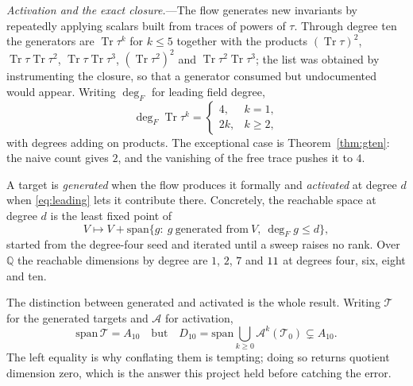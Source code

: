 \documentclass[
  aps,prd,
  reprint,
  letterpaper,
  amsmath,amssymb,
  nofootinbib,
  superscriptaddress
]{revtex4-2}
\theoremstyle{plain}
\newcommand{\Ften}{A_{10}}
\newcommand{\Dten}{D_{10}}
\newcommand{\Q}{\mathbb{Q}}
\begin{document}
\emph{Activation and the exact closure.}---The flow generates new invariants by
repeatedly applying scalars built from traces of powers of $\tau$. Through
degree ten the generators are $\operatorname{Tr}\tau^{k}$ for $k\le5$ together
with the products
$(\operatorname{Tr}\tau)^2$, $\operatorname{Tr}\tau\operatorname{Tr}\tau^{2}$,
$\operatorname{Tr}\tau\operatorname{Tr}\tau^{3}$,
$(\operatorname{Tr}\tau^{2})^{2}$ and
$\operatorname{Tr}\tau^{2}\operatorname{Tr}\tau^{3}$; the list was obtained by
instrumenting the closure, so that a generator consumed but undocumented would
appear. Writing $\deg_F$ for leading field degree,
\begin{equation}
\deg_F\operatorname{Tr}\tau^{k}=
\begin{cases}4,&k=1,\\ 2k,&k\ge2,\end{cases}
\label{eq:leading}
\end{equation}
with degrees adding on products. The exceptional case is
Theorem~\ref{thm:gten}: the naive count gives $2$, and the vanishing of the free
trace pushes it to $4$.

A target is \emph{generated} when the flow produces it formally and
\emph{activated} at degree $d$ when \eqref{eq:leading} lets it contribute there.
Concretely, the reachable space at degree $d$ is the least fixed point of
\begin{equation}
V\longmapsto V+\mathrm{span}\bigl\{g:\ g\ \text{generated from}\ V,\
\deg_F g\le d\bigr\},
\label{eq:closureop}
\end{equation}
started from the degree-four seed and iterated until a sweep raises no rank.
Over $\Q$ the reachable dimensions by degree are $1$, $2$, $7$ and $11$
at degrees four, six, eight and ten.

The distinction between generated and activated is the whole result. Writing
$\mathcal{T}$ for the generated targets and $\mathcal{A}$ for activation,
\begin{equation}
\mathrm{span}\,\mathcal{T}=\Ften
\quad\text{but}\quad
\Dten=\mathrm{span}\!\bigcup_{k\ge0}\mathcal{A}^{k}(\mathcal{T}_0)\subsetneq\Ften .
\label{eq:rawvsact}
\end{equation}
The left equality is why conflating them is tempting; doing so returns quotient
dimension zero, which is the answer this project held before catching the error.
\end{document}
